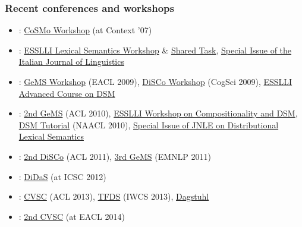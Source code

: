 \begin{frame}
  \frametitle{Recent conferences and workshops}

  \ungap[1]
  \begin{itemize}
  \item {}: \href{http://clic.cimec.unitn.it/marco/beyond_words/}{CoSMo Workshop} (at Context '07)
  \item {}: \href{http://wordspace.collocations.de/doku.php/workshop:esslli:start}{ESSLLI Lexical Semantics Workshop} \& \href{http://wordspace.collocations.de/doku.php/workshop:esslli:task}{Shared Task}, \href{http://linguistica.sns.it/RdL/2008.html}{Special Issue of the Italian Journal of Linguistics}
  \item {}: \href{http://art.uniroma2.it/gems/}{GeMS Workshop} (EACL 2009), \href{http://www.let.rug.nl/disco2009/}{DiSCo Workshop} (CogSci 2009), \href{http://wordspace.collocations.de/doku.php/course:esslli2009:start}{ESSLLI Advanced Course on DSM}
  \item {}: \href{http://art.uniroma2.it/gems010/}{2nd GeMS} (ACL 2010), \href{http://clic.cimec.unitn.it/roberto/ESSLLI10-dsm-workshop/}{ESSLLI Workshop on Compositionality and DSM}, \href{http://naaclhlt2010.isi.edu/tutorials/t4.html}{DSM Tutorial} (NAACL 2010), \href{http://journals.cambridge.org/action/displayIssue?iid=7911772}{Special Issue of JNLE on Distributional Lexical Semantics}
  \item {}: \href{http://disco2011.fzi.de}{2nd DiSCo} (ACL 2011), \href{https://sites.google.com/site/geometricalmodels/}{3rd GeMS} (EMNLP 2011)
  \item {}: \href{http://didas.org}{DiDaS} (at ICSC 2012)
  \item {}: \href{https://sites.google.com/site/cvscworkshop/}{CVSC} (ACL 2013), \href{http://clic.cimec.unitn.it/roberto/IWCS-TFDS2013/}{TFDS} (IWCS 2013), \href{http://www.dagstuhl.de/en/program/calendar/semhp/?semnr=13462}{Dagstuhl}
  \item {}: \href{https://sites.google.com/site/cvscworkshop2014/}{2nd CVSC} (at EACL 2014)
  \end{itemize}
  \hfill{}
\end{frame}


